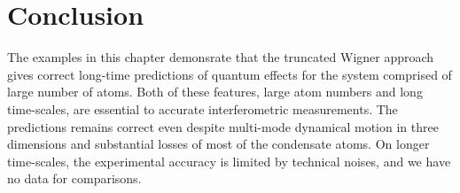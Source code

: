 \section{Conclusion}

The examples in this chapter demonsrate that the truncated Wigner approach gives correct long-time predictions of quantum effects for the system comprised of large number of atoms.
Both of these features, large atom numbers and long time-scales, are essential to accurate interferometric measurements.
The predictions remains correct even despite multi-mode dynamical motion in three dimensions and substantial losses of most of the condensate atoms.
On longer time-scales, the experimental accuracy is limited by technical noises, and we have no data for comparisons.
